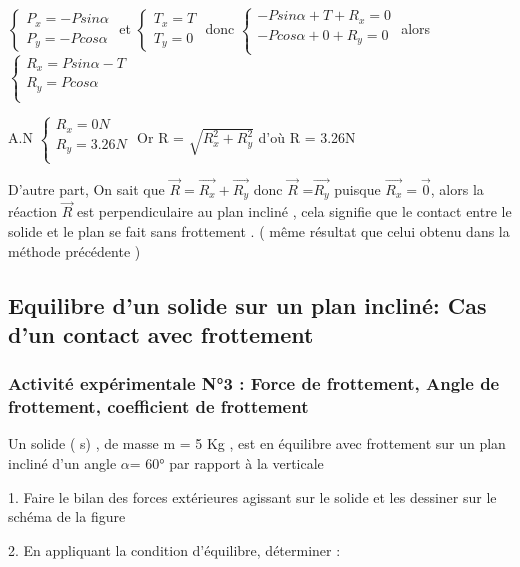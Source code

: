 \documentclass[12pt]{article}
\begin{document}
$\begin{cases}
  P_x = -Psin\alpha\\
  P_y = -Pcos\alpha
\end{cases}
$ et 
$\begin{cases}
  T_x = T\\
  T_y = 0
\end{cases}
$ donc 
$\begin{cases}
  -Psin\alpha + T + R_x = 0\\
  -Pcos\alpha + 0 + R_y = 0\\
\end{cases}
$
alors 
$\begin{cases}
  R_x = Psin\alpha - T \\
  R_y = Pcos\alpha\\
\end{cases}
$

A.N
$
\begin{cases}
  R_x = 0 N \\
  R_y = 3.26N\\
\end{cases}
$
Or R = $\sqrt{R_x^2 + R_y^2}$ d’où R = 3.26N

D’autre part, On sait que $\vec{R} = \vec{R_x}  + \vec{R_y}$ donc $\vec{R}$ =$\vec{R_y}$ puisque $\vec{R_x} = \vec{0}$, alors la réaction $\vec{R}$ est
perpendiculaire au plan incliné , cela signifie que le contact entre le solide et le plan se fait sans
frottement . ( même résultat que celui obtenu dans la méthode précédente )

\vspace{4cm}

\subsection{Equilibre d’un solide sur un plan incliné: Cas d’un contact avec frottement }
\subsubsection{Activité expérimentale N°3 : Force de frottement, Angle de frottement, coefficient de frottement  }
Un solide ( s) , de masse m = 5 Kg , est en équilibre avec frottement sur un plan incliné d’un angle $\alpha $= 60°
par rapport à la verticale 

1. Faire le bilan des forces extérieures agissant sur le solide et les
dessiner sur le schéma de la figure

2. En appliquant la condition d’équilibre, déterminer :
  
\end{document}
